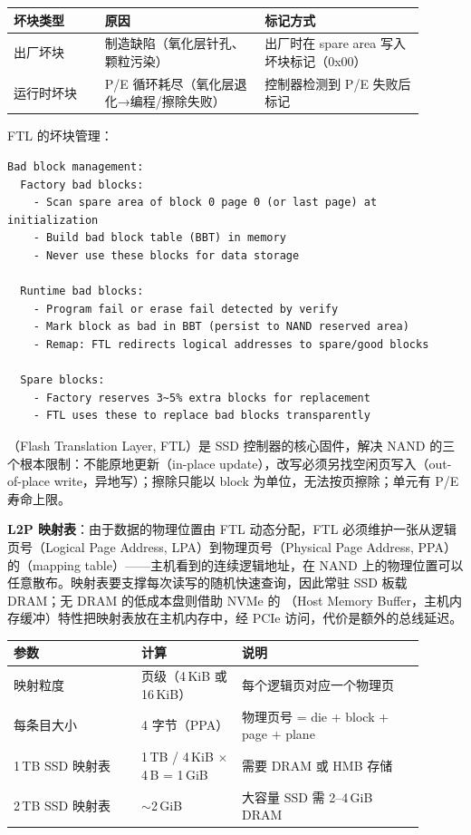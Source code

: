 \begin{longtable}{L{0.2\linewidth}L{0.35\linewidth}L{0.35\linewidth}}
\toprule
坏块类型 & 原因 & 标记方式 \\
\midrule
出厂坏块 & 制造缺陷（氧化层针孔、颗粒污染） & 出厂时在 spare area 写入坏块标记（0x00） \\
运行时坏块 & P/E 循环耗尽（氧化层退化→编程/擦除失败） & 控制器检测到 P/E 失败后标记 \\
\bottomrule
\end{longtable}

FTL 的坏块管理：
\begin{lstlisting}
Bad block management:
  Factory bad blocks:
    - Scan spare area of block 0 page 0 (or last page) at initialization
    - Build bad block table (BBT) in memory
    - Never use these blocks for data storage

  Runtime bad blocks:
    - Program fail or erase fail detected by verify
    - Mark block as bad in BBT (persist to NAND reserved area)
    - Remap: FTL redirects logical addresses to spare/good blocks

  Spare blocks:
    - Factory reserves 3~5% extra blocks for replacement
    - FTL uses these to replace bad blocks transparently
\end{lstlisting}


（Flash Translation Layer, FTL）是 SSD 控制器的核心固件，解决 NAND 的三个根本限制：不能原地更新（in-place update），改写必须另找空闲页写入（out-of-place write，异地写）；擦除只能以 block 为单位，无法按页擦除；单元有 P/E 寿命上限。

\textbf{L2P 映射表}：由于数据的物理位置由 FTL 动态分配，FTL 必须维护一张从逻辑页号（Logical Page Address, LPA）到物理页号（Physical Page Address, PPA）的（mapping table）——主机看到的连续逻辑地址，在 NAND 上的物理位置可以任意散布。映射表要支撑每次读写的随机快速查询，因此常驻 SSD 板载 DRAM；无 DRAM 的低成本盘则借助 NVMe 的 （Host Memory Buffer，主机内存缓冲）特性把映射表放在主机内存中，经 PCIe 访问，代价是额外的总线延迟。

\begin{longtable}{L{0.28\linewidth}L{0.22\linewidth}L{0.4\linewidth}}
\toprule
参数 & 计算 & 说明 \\
\midrule
映射粒度 & 页级（4\,KiB 或 16\,KiB） & 每个逻辑页对应一个物理页 \\
每条目大小 & 4 字节（PPA） & 物理页号 = die + block + page + plane \\
1\,TB SSD 映射表 & 1\,TB / 4\,KiB $\times$ 4\,B = 1\,GiB & 需要 DRAM 或 HMB 存储 \\
2\,TB SSD 映射表 & $\sim$2\,GiB & 大容量 SSD 需 2--4\,GiB DRAM \\
\bottomrule
\end{longtable}

